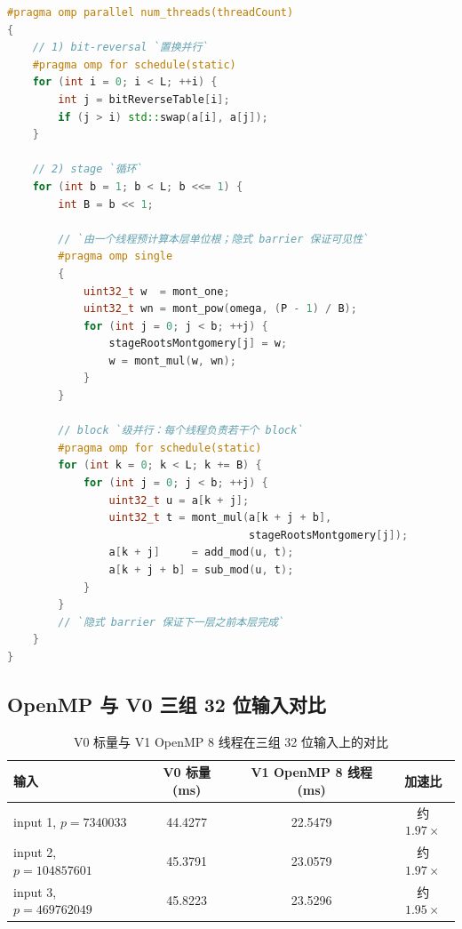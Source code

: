 \documentclass[UTF8,a4paper,10pt]{ctexart}
\begin{document}
\begin{lstlisting}[title=OpenMP NTT 主体伪代码,frame=trbl,language={C++}]
#pragma omp parallel num_threads(threadCount)
{
    // 1) bit-reversal `置换并行`
    #pragma omp for schedule(static)
    for (int i = 0; i < L; ++i) {
        int j = bitReverseTable[i];
        if (j > i) std::swap(a[i], a[j]);
    }

    // 2) stage `循环`
    for (int b = 1; b < L; b <<= 1) {
        int B = b << 1;

        // `由一个线程预计算本层单位根；隐式 barrier 保证可见性`
        #pragma omp single
        {
            uint32_t w  = mont_one;
            uint32_t wn = mont_pow(omega, (P - 1) / B);
            for (int j = 0; j < b; ++j) {
                stageRootsMontgomery[j] = w;
                w = mont_mul(w, wn);
            }
        }

        // block `级并行：每个线程负责若干个 block`
        #pragma omp for schedule(static)
        for (int k = 0; k < L; k += B) {
            for (int j = 0; j < b; ++j) {
                uint32_t u = a[k + j];
                uint32_t t = mont_mul(a[k + j + b],
                                      stageRootsMontgomery[j]);
                a[k + j]     = add_mod(u, t);
                a[k + j + b] = sub_mod(u, t);
            }
        }
        // `隐式 barrier 保证下一层之前本层完成`
    }
}
\end{lstlisting}

\subsection{OpenMP 与 V0 三组 32 位输入对比}

\begin{table}[H]
  \centering
  \begin{tabular}{lccc}
  \toprule  
  \textbf{输入} & \textbf{V0 标量} (ms) & \textbf{V1 OpenMP 8 线程} (ms) & \textbf{加速比}\\
  \midrule
  input 1, $p = 7340033$    & 44.4277 & 22.5479 & 约 $1.97\times$ \\
  input 2, $p = 104857601$  & 45.3791 & 23.0579 & 约 $1.97\times$ \\
  input 3, $p = 469762049$  & 45.8223 & 23.5296 & 约 $1.95\times$ \\
  \bottomrule
  \end{tabular}
  \caption{V0 标量与 V1 OpenMP 8 线程在三组 32 位输入上的对比}
  \label{tab:v0vsomp}
\end{table}
\end{document}
